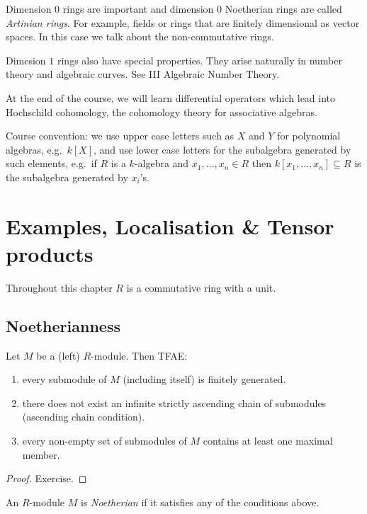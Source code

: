 \documentclass[a4paper]{article}
\begin{document}
Dimension \(0\) rings are important and dimension \(0\) Noetherian rings are called \emph{Artinian rings}. For example, fields or rings that are finitely dimensional as vector spaces. In this case we talk about the non-commutative rings.

Dimesion \(1\) rings also have special properties. They arise naturally in number theory and algebraic curves. See III Algebraic Number Theory.

At the end of the course, we will learn differential operators which lead into Hochschild cohomology, the cohomology theory for associative algebras.

Course convention: we use upper case letters such as \(X\) and \(Y\) for polynomial algebras, e.g.\ \(k[X]\), and use lower case letters for the subalgebra generated by such elements, e.g.\ if \(R\) is a \(k\)-algebra and \(x_1, \dots, x_n \in R\) then \(k[x_1, \dots, x_n] \subseteq R\) is the subalgebra generated by \(x_i\)'s.

\section{Examples, Localisation \& Tensor products}

Throughout this chapter \(R\) is a commutative ring with a unit.

\subsection{Noetherianness}

\begin{lemma}
  Let \(M\) be a (left) \(R\)-module. Then TFAE:
  \begin{enumerate}
  \item every submodule of \(M\) (including itself) is finitely generated.
  \item there does not exist an infinite strictly ascending chain of submodules (ascending chain condition).
  \item every non-empty set of submodules of \(M\) contains at least one maximal member.
  \end{enumerate}
\end{lemma}

\begin{proof}
  Exercise.
\end{proof}

\begin{definition}
  An \(R\)-module \(M\) is \emph{Noetherian} if it satisfies any of the conditions above.
\end{definition}
\end{document}
